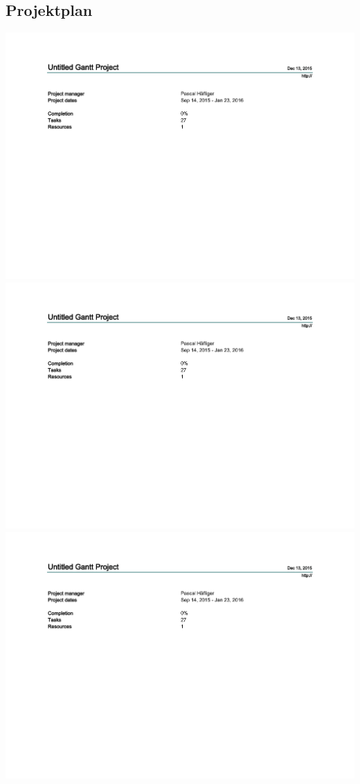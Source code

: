 \begin{landscape}
\subsection*{Projektplan}
\includegraphics[scale=0.75,page=2]{tex/90_appendix/schedule.pdf} 
\clearpage
\includegraphics[scale=0.75,page=3]{tex/90_appendix/schedule.pdf} 
\clearpage
\includegraphics[scale=0.75,page=5]{tex/90_appendix/schedule.pdf} 
\end{landscape}